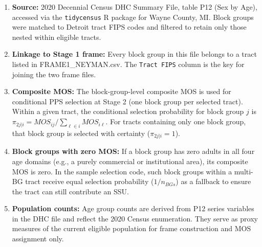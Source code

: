 \documentclass[
  11pt,
]{article}
\begin{document}
\begin{enumerate}
\def\labelenumi{\arabic{enumi}.}
\item
  \textbf{Source:} 2020 Decennial Census DHC Summary File, table P12
  (Sex by Age), accessed via the \texttt{tidycensus} R package for Wayne
  County, MI. Block groups were matched to Detroit tract FIPS codes and
  filtered to retain only those nested within eligible tracts.
\item
  \textbf{Linkage to Stage 1 frame:} Every block group in this file
  belongs to a tract listed in FRAME1\_NEYMAN.csv. The
  \texttt{Tract\ FIPS} column is the key for joining the two frame
  files.
\item
  \textbf{Composite MOS:} The block-group-level composite MOS is used
  for conditional PPS selection at Stage 2 (one block group per selected
  tract). Within a given tract, the conditional selection probability
  for block group \(j\) is
  \(\pi_{2j|i} = MOS_{ij} / \sum_{\ell \in i} MOS_{i\ell}\). For tracts
  containing only one block group, that block group is selected with
  certainty (\(\pi_{2j|i} = 1\)).
\item
  \textbf{Block groups with zero MOS:} If a block group has zero adults
  in all four age domains (e.g., a purely commercial or institutional
  area), its composite MOS is zero. In the sample selection code, such
  block groups within a multi-BG tract receive equal selection
  probability (\(1/n_{BGs}\)) as a fallback to ensure the tract can
  still contribute an SSU.
\item
  \textbf{Population counts:} Age group counts are derived from P12
  series variables in the DHC file and reflect the 2020 Census
  enumeration. They serve as proxy measures of the current eligible
  population for frame construction and MOS assignment only.
\end{enumerate}
\end{document}
